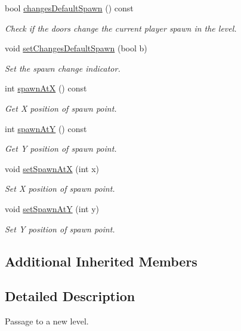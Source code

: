 \begin{DoxyCompactItemize}
bool \hyperlink{class_door_a5d65aee71d60f72cae37d085d19faa80}{changes\+Default\+Spawn} () const
\begin{DoxyCompactList}\small\item\em Check if the doors change the current player spawn in the level. \end{DoxyCompactList}\item 
void \hyperlink{class_door_a95fe6168b86f58e1a29a4ce40079afb0}{set\+Changes\+Default\+Spawn} (bool b)
\begin{DoxyCompactList}\small\item\em Set the spawn change indicator. \end{DoxyCompactList}\item 
int \hyperlink{class_door_af36a171c2f6e3fe7b21d2027ada4199f}{spawn\+AtX} () const
\begin{DoxyCompactList}\small\item\em Get X position of spawn point. \end{DoxyCompactList}\item 
int \hyperlink{class_door_a35f7940f9b52caad0bbf39d2054fd0a4}{spawn\+AtY} () const
\begin{DoxyCompactList}\small\item\em Get Y position of spawn point. \end{DoxyCompactList}\item 
void \hyperlink{class_door_ab527eafbfd4fc67d5a17f20169ff9883}{set\+Spawn\+AtX} (int x)
\begin{DoxyCompactList}\small\item\em Set X position of spawn point. \end{DoxyCompactList}\item 
void \hyperlink{class_door_ac4aad24a6a7125c8e2cd136d4e70d0cf}{set\+Spawn\+AtY} (int y)
\begin{DoxyCompactList}\small\item\em Set Y position of spawn point. \end{DoxyCompactList}\end{DoxyCompactItemize}
\subsection*{Additional Inherited Members}


\subsection{Detailed Description}
Passage to a new level. 


